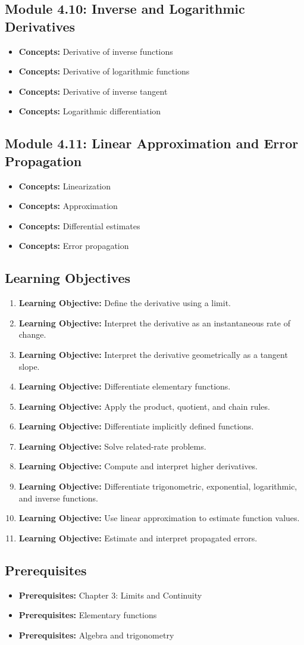 \documentclass[11pt]{article}
\newcommand{\objective}[1]{\item \textbf{Learning Objective:} #1}
\newcommand{\concept}[1]{\item \textbf{Concepts:} #1}
\newcommand{\prereq}[1]{\item \textbf{Prerequisites:} #1}
\begin{document}
\subsection{Module 4.10: Inverse and Logarithmic Derivatives}

\begin{itemize}
    \concept{Derivative of inverse functions}
    \concept{Derivative of logarithmic functions}
    \concept{Derivative of inverse tangent}
    \concept{Logarithmic differentiation}
\end{itemize}

\subsection{Module 4.11: Linear Approximation and Error Propagation}

\begin{itemize}
    \concept{Linearization}
    \concept{Approximation}
    \concept{Differential estimates}
    \concept{Error propagation}
\end{itemize}

\subsection{Learning Objectives}

\begin{enumerate}
    \objective{Define the derivative using a limit.}
    \objective{Interpret the derivative as an instantaneous rate of change.}
    \objective{Interpret the derivative geometrically as a tangent slope.}
    \objective{Differentiate elementary functions.}
    \objective{Apply the product, quotient, and chain rules.}
    \objective{Differentiate implicitly defined functions.}
    \objective{Solve related-rate problems.}
    \objective{Compute and interpret higher derivatives.}
    \objective{Differentiate trigonometric, exponential, logarithmic,
    and inverse functions.}
    \objective{Use linear approximation to estimate function values.}
    \objective{Estimate and interpret propagated errors.}
\end{enumerate}

\subsection{Prerequisites}

\begin{itemize}
    \prereq{Chapter 3: Limits and Continuity}
    \prereq{Elementary functions}
    \prereq{Algebra and trigonometry}
\end{itemize}
\end{document}
